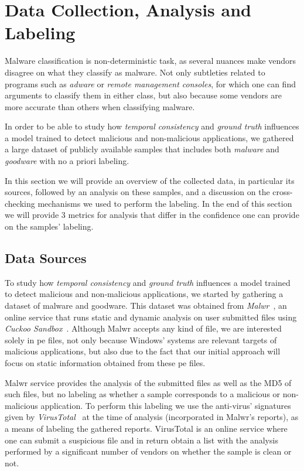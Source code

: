 \color{black}

\section{Data Collection, Analysis and Labeling}\label{sec:data}

Malware classification is non-deterministic task, as several nuances make vendors disagree on what they classify as malware. Not only subtleties related to programs such as \emph{adware} or \emph{remote management consoles}, for which one can find arguments to classify them in either class, but also because some vendors are more accurate than others when classifying malware.

In order to be able to study how \emph{temporal consistency} and \emph{ground truth} influences a model trained to detect malicious and non-malicious applications, we gathered a large dataset of publicly available samples that includes both \emph{malware} and \emph{goodware} with no a priori labeling.

In this section we will provide an overview of the collected data, in particular its sources, followed by an analysis on these samples, and a discussion on the cross-checking mechanisms we used to perform the labeling. In the end of this section we will provide 3 metrics for analysis that differ in the confidence one can provide on the samples' labeling.

\subsection{Data Sources}\label{sub_sec:data_collection}

To study how \emph{temporal consistency} and \emph{ground truth} influences a model trained to detect malicious and non-malicious applications, we started by gathering a dataset of malware and goodware.
This dataset was obtained from \emph{Malwr}~\cite{tool:malwr}, an online service that runs static and dynamic analysis on user submitted files using \emph{Cuckoo Sandbox}~\cite{tool:cuckoo}.
Although Malwr accepts any kind of file, we are interested solely in \gls{pe} files, not only because Windows' systems are relevant targets of malicious applications, but also due to the fact that our initial approach will focus on static information obtained from these \gls{pe} files.

Malwr service provides the analysis of the submitted files as well as the MD5 of such files, but no labeling as whether a sample corresponds to a malicious or non-malicious application.
To perform this labeling we use the anti-virus' signatures given by \emph{VirusTotal}~\cite{tool:virustotal} at the time of analysis (incorporated in Malwr's reports), as a means of labeling the gathered reports.
VirusTotal is an online service where one can submit a suspicious file and in return obtain a list with the analysis performed by a significant number of vendors on whether the sample is clean or not. 

